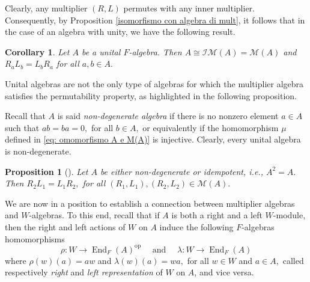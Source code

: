 \documentclass[reqno]{amsart}
\newtheorem{corollary}[theorem]{Corollary}
\newtheorem{proposition}[theorem]{Proposition}
\theoremstyle{definition}
\numberwithin{equation}{section}
\numberwithin{theorem}{section}
\DeclareMathOperator{\End}{End}
\newcommand{\M}{\mathcal{M}}
\newcommand{\IM}{\mathcal{I}\mathcal{M}}
\DeclareMathOperator{\op}{op}
\begin{document}
Clearly, any multiplier $(R,L)$ permutes with any inner multiplier.  Consequently, by Proposition \ref{isomorfismo con algebra di mult}, it follows that in the case of an algebra with unity, we have the following result. 

\begin{corollary}\label{mutiplier per algebre con unit}
    Let $A$ be a unital $F$-algebra. Then 
     $A\cong\IM(A)=\M(A)$
    and 
    $
    R_aL_b = L_bR_a
    $
    for all $a,b\in A.$
\end{corollary}

Unital algebras are not the only type of algebras for which the multiplier algebra satisfies the permutability property, as highlighted in the following proposition.

Recall that $A$ is said \emph{non-degenerate algebra} if there is no nonzero element $a\in A$ such that $ab = ba = 0,$ for all $b\in A,$ or equivalently if the homomorphism $\mu$ defined in \eqref{eq: omomorfismo A e M(A)}
is injective. Clearly, every unital algebra is non-degenerate.

\begin{proposition}[{\cite[Proposition 7.9]{Exelbook}}]
\label{pro: commutazione tra pezzi di mult}
    Let $A$ be either non-degenerate or idempotent, i.e., $A^2=A.$ Then 
    $
    R_2L_1 = L_1R_2,
    $
    for all $(R_1,L_1),(R_2,L_2)\in\M(A).$
\end{proposition}




We are now in a position to establish a connection between multiplier algebras and $W$-algebras.
To this end, recall that if $A$ is both a right and a left $W$-module, then the right and left actions of $W$ on $A$  induce the following $F$-algebras homomorphisms
\begin{equation*}%
  \rho: W\rightarrow\End_F(A)^{\op}  \quad \text{ and }\quad \lambda:W\rightarrow\End_F(A)
\end{equation*}
where $\rho(w)(a) = aw$ and $\lambda(w)(a)= wa,$ for all $w\in W$ and $a\in A,$ called respectively \emph{right} and \emph{left representation} of $W$ on $A$, and vice versa. 
\end{document}
